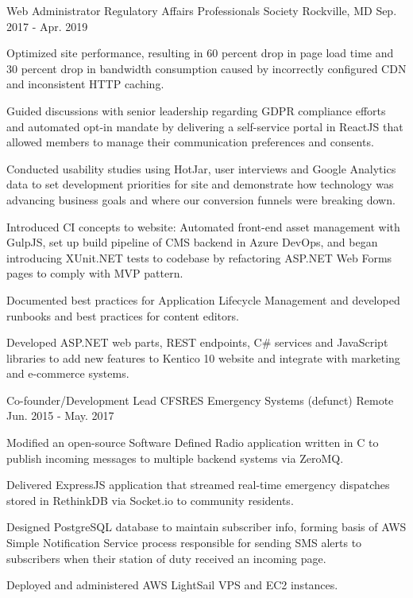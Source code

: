 \begin{cventries}
  \cventry
    {Web Administrator} %
    {Regulatory Affairs Professionals Society} %
    {Rockville, MD} %
    {Sep. 2017 - Apr. 2019} %
    {
      \begin{cvitems} %
		\item {Optimized site performance, resulting in 60 percent drop in page load time and 30 percent drop in bandwidth consumption caused by incorrectly configured CDN and inconsistent HTTP caching.}
		\item {Guided discussions with senior leadership regarding GDPR compliance efforts and automated opt-in mandate by delivering a self-service portal in ReactJS that allowed members to manage their communication preferences and consents.}
		\item {Conducted usability studies using HotJar, user interviews and Google Analytics data to set development priorities for site and demonstrate how technology was advancing business goals and where our conversion funnels were breaking down.}
        \item {Introduced CI concepts to website: Automated front-end asset management with GulpJS, set up build pipeline of CMS backend in Azure DevOps, and began introducing XUnit.NET tests to codebase by refactoring ASP.NET Web Forms pages to comply with MVP pattern.}
        \item {Documented best practices for Application Lifecycle Management and developed runbooks and best practices for content editors.}
        \item {Developed ASP.NET web parts, REST endpoints, C\# services and JavaScript libraries to add new features to Kentico 10 website and integrate with marketing and e-commerce systems.}
      \end{cvitems}
    }

\cventry
{Co-founder/Development Lead} %
{CFSRES Emergency Systems (defunct)} %
{Remote} %
{Jun. 2015 - May. 2017} %
{
    \begin{cvitems} %
        \item {Modified an open-source Software Defined Radio application written in C to publish incoming messages to multiple backend systems via ZeroMQ.}
        \item {Delivered ExpressJS application that streamed real-time emergency dispatches stored in RethinkDB via Socket.io to community residents.}
        \item {Designed PostgreSQL database to maintain subscriber info, forming basis of AWS Simple Notification Service process responsible for sending SMS alerts to subscribers when their station of duty received an incoming page.}
        \item {Deployed and administered AWS LightSail VPS and EC2 instances.}
    \end{cvitems}
}


\end{cventries}
